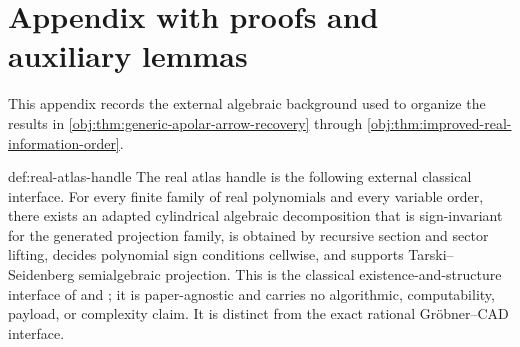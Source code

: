 \section{Appendix with proofs and auxiliary lemmas}

This appendix records the external algebraic background used to organize the results in \cref{obj:thm:generic-apolar-arrow-recovery} through \cref{obj:thm:improved-real-information-order}.

\begin{remarkv}{def:real-atlas-handle}
The real atlas handle is the following external classical interface.  For every finite family of real polynomials and every variable order, there exists an adapted cylindrical algebraic decomposition that is sign-invariant for the generated projection family, is obtained by recursive section and sector lifting, decides polynomial sign conditions cellwise, and supports Tarski--Seidenberg semialgebraic projection.  This is the classical existence-and-structure interface of \citet[Section~2.3 and Theorem~2.2.1]{BochnakCosteRoy1998} and \citet[Chapter~5]{BasuPollackRoy2006}; it is paper-agnostic and carries no algorithmic, computability, payload, or complexity claim.  It is distinct from the exact rational Gröbner--CAD interface.
\end{remarkv}

